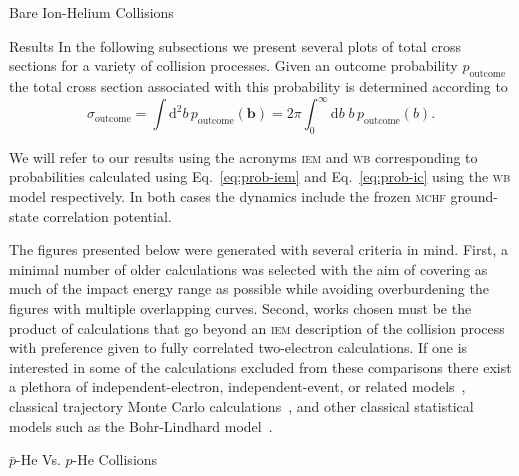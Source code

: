 \documentclass[letterpaper, 11 pt]{report}
\begin{document}
\begin{chapter}{Bare Ion-Helium Collisions \label{chap:p-he2p-he}}
\begin{section}{Results \label{sec:phe2p-res}}
      In the following subsections we present several plots of total cross sections for a variety of
      collision processes. Given an outcome probability $p_\mathrm{outcome}$ the total cross section
      associated with this probability is determined according to
      \begin{equation} \label{eq:tcs}
         \sigma_\mathrm{outcome} = \int \mathrm{d}^2 b \, p_\mathrm{outcome} (\mathbf{b})
         = 2 \pi \int^\infty_0 \mathrm{d}b \; b \, p_\mathrm{outcome} (b).
      \end{equation}

      We will refer to our results using the acronyms \textsc{iem} and \textsc{wb} corresponding to
      probabilities calculated using Eq.~\eqref{eq:prob-iem} and Eq.~\eqref{eq:prob-ic} using the
      \textsc{wb} model respectively. In both cases the dynamics include the frozen \textsc{mchf}
      ground-state correlation potential.

      The figures presented below were generated with several criteria in mind. First, a minimal number
      of older calculations was selected with the aim of covering as much of the impact energy range as
      possible while avoiding overburdening the figures with multiple overlapping curves. Second, works
      chosen must be the product of calculations that go beyond an \textsc{iem} description of the
      collision process with preference given to fully correlated two-electron calculations. If one is
      interested in some of the calculations excluded from these comparisons there exist a plethora of
      independent-electron, independent-event, or related models~\cite{SLD-83, DMR-84, SLD-85, GM-86,
      CM-87, GM-87, JLF-89, DC-90, DC-91a, DC-91b, DG-91, SKG-91, SL-91, Kuang-92, MLC-93, CM-94,
      CSR-95, BDM-96, MBGH-97, McCartney-97, McCartney-99, GAMRF-02, GFS-02, AMRF-04, BLMC-04, FRBJG-06,
      FJG-07, GIFK-08, ZK-09, G-11, LFG-11, GG-12a}, classical trajectory Monte Carlo
      calculations~\cite{ZM-85, OWM-86, MO-87, WO-88, MS-89, Cohen-96, TH-96, MMTH-02, DAKW-04, GEP-09},
      and other classical statistical models such as the Bohr-Lindhard model~\cite{DYC-08,Ding-12}.

      \begin{subsection}{ \texorpdfstring{$\bar{p}$}{pbar}-He Vs. \texorpdfstring{$p$}{p}-He Collisions
                         \label{sec:pbarhe-res}}


\end{subsection}
\end{section}
\end{chapter}
\end{document}
